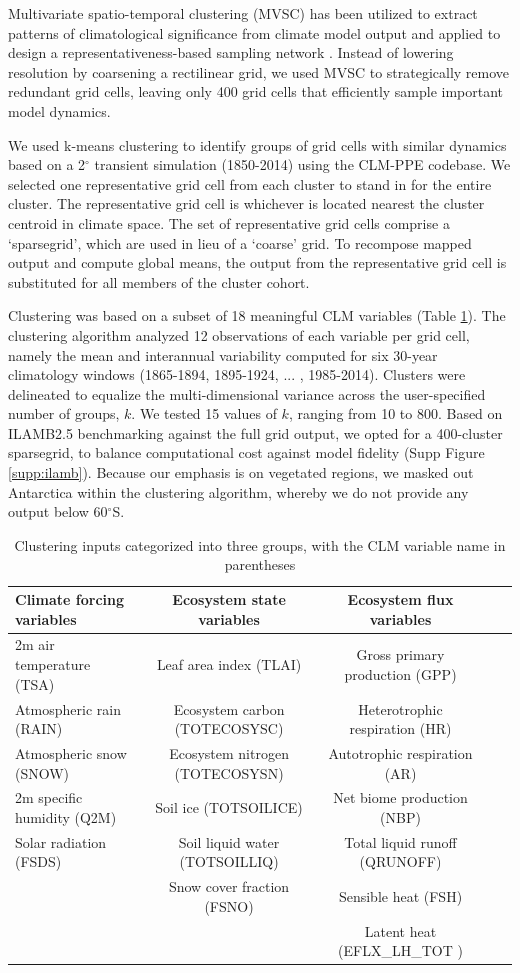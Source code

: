 \documentclass[draft]{agujournal2019}
\begin{document}
Multivariate spatio-temporal clustering (MVSC) has been utilized to extract patterns of climatological significance from climate model output \cite{hoffman2005} and applied to design a representativeness-based sampling network \cite{hoffman2013}. Instead of lowering resolution by coarsening a rectilinear grid, we used MVSC to strategically remove redundant grid cells, leaving only 400 grid cells that efficiently sample important model dynamics.

We used k-means clustering to identify groups of grid cells with similar dynamics based on a 2$^\circ$ transient simulation (1850-2014) using the CLM-PPE codebase. We selected one representative grid cell from each cluster to stand in for the entire cluster. The representative grid cell is whichever is located nearest the cluster centroid in climate space. The set of representative grid cells comprise a `sparsegrid', which are used in lieu of a `coarse' grid. To recompose mapped output and compute global means, the output from the representative grid cell is substituted for all members of the cluster cohort.

Clustering was based on a subset of 18 meaningful CLM variables (Table \ref{tab:sg}). The clustering algorithm analyzed 12 observations of each variable per grid cell, namely the mean and interannual variability computed for six 30-year climatology windows (1865-1894, 1895-1924, ... , 1985-2014). Clusters were delineated to equalize the multi-dimensional variance across the user-specified number of groups, $k$. We tested 15 values of $k$, ranging from 10 to 800. Based on ILAMB2.5 benchmarking \cite{collier2018} against the full grid output, we opted for a 400-cluster sparsegrid, to balance computational cost against model fidelity (Supp Figure \ref{supp:ilamb}). Because our emphasis is on vegetated regions, we masked out Antarctica within the clustering algorithm, whereby we do not provide any output below 60$^\circ$S.

\begin{table}[h]
\caption{Clustering inputs categorized into three groups, with the CLM variable name in parentheses}
\centering
\begin{tabular}{l c c c c}
 \hline
 Climate forcing variables & Ecosystem state variables &Ecosystem flux variables \\
 \hline
 2m air temperature (TSA) & Leaf area index (TLAI) & Gross primary production (GPP) \\
Atmospheric rain (RAIN) & Ecosystem carbon (TOTECOSYSC) &Heterotrophic respiration (HR) \\
Atmospheric snow (SNOW) &  Ecosystem nitrogen (TOTECOSYSN) &Autotrophic respiration (AR) \\
2m specific humidity (Q2M) & Soil ice (TOTSOILICE) &Net biome production (NBP) \\
Solar radiation (FSDS) & Soil liquid water (TOTSOILLIQ) & Total liquid runoff (QRUNOFF) \\
& Snow cover fraction (FSNO) & Sensible heat  (FSH) \\
&&Latent heat (EFLX\_LH\_TOT ) \\
 \hline
 \end{tabular}
 \label{tab:sg}
 \end{table}
\end{document}
